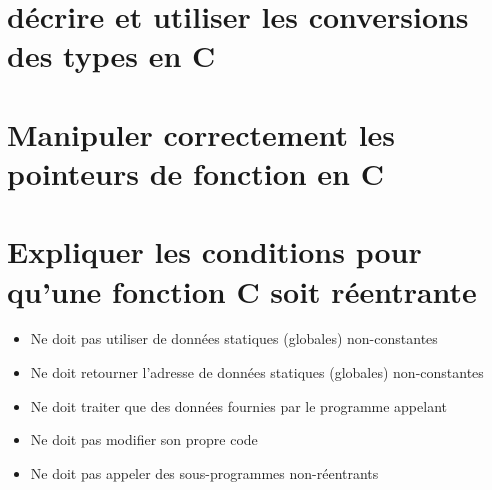 \section{décrire et utiliser les conversions des types en C}





\section{Manipuler correctement les pointeurs de fonction en C}







\section{Expliquer les conditions pour qu’une fonction C soit réentrante}

\begin{itemize}
    \item Ne doit pas utiliser de données statiques (globales) non-constantes
    \item Ne doit retourner l’adresse de données statiques (globales) non-constantes
    \item Ne doit traiter que des données fournies par le programme appelant
    \item Ne doit pas modifier son propre code
    \item Ne doit pas appeler des sous-programmes non-réentrants
\end{itemize}


